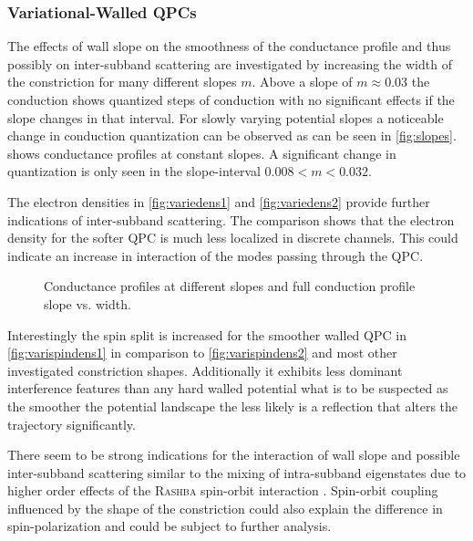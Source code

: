 \subsubsection{Variational-Walled QPCs}
The effects of wall slope on the smoothness of the conductance profile and thus possibly on inter-subband scattering are investigated by increasing the width of the constriction for many different slopes $m$. Above a slope of $m \approx 0.03$ the conduction shows quantized steps of conduction with no significant effects if the slope changes in that interval. For slowly varying potential slopes a noticeable change in conduction quantization can be observed as can be seen in \cref{fig:slopes}.  shows conductance profiles at constant slopes. A significant change in quantization is only seen in the slope-interval $0.008 \lt m \lt 0.032$.\par
The electron densities in \cref{fig:variedens1} and \cref{fig:variedens2} provide further indications of inter-subband scattering. The comparison shows that the electron density for the softer QPC is much less localized in discrete channels. This could indicate an increase in interaction of the modes passing through the QPC.\par
\begin{figure}[h] 
\centering
{}
\caption{Conductance profiles at different slopes and full conduction profile slope vs. width.}\label{fig:conductances}
\end{figure}
Interestingly the spin split is increased for the smoother walled QPC in \cref{fig:varispindens1} in comparison to \cref{fig:varispindens2} and most other investigated constriction shapes. Additionally it exhibits less dominant interference features than any hard walled potential what is to be suspected as the smoother the potential landscape the less likely is a reflection that alters the trajectory significantly.\par
There seem to be strong indications for the interaction of wall slope and possible inter-subband scattering similar to the mixing of intra-subband eigenstates due to higher order effects of the \textsc{Rashba} spin-orbit interaction \cite{Wolfgang2003PhysicaE.18.337}. Spin-orbit coupling influenced by the shape of the constriction could also explain the difference in spin-polarization and could be subject to further analysis.
